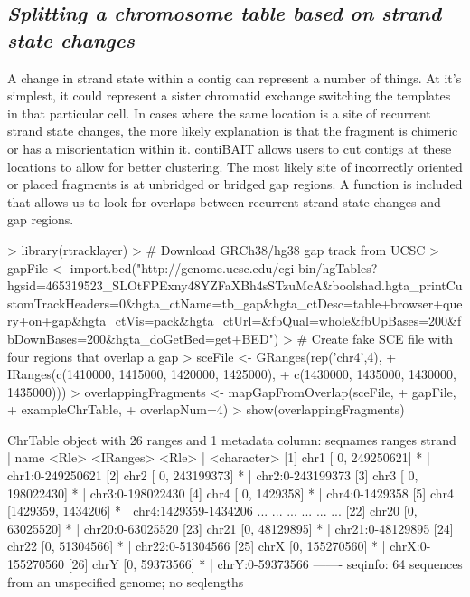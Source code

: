 \documentclass{article}
\begin{document}
\subsection{\textit{Splitting a chromosome table based on strand state changes}}
A change in strand state within a contig can represent a number of things. At it's simplest, it could represent a sister chromatid exchange switching the templates in that particular cell. In cases where the same location is a site of recurrent strand state changes, the more likely explanation is that the fragment is chimeric or has a misorientation within it. contiBAIT allows users to cut contigs at these locations to allow for better clustering. The most likely site of incorrectly oriented or placed fragments is at unbridged or bridged gap regions. A function is included that allows us to look for overlaps between recurrent strand state changes and gap regions.

\begin{Schunk}
\begin{Sinput}
> library(rtracklayer)
> # Download GRCh38/hg38 gap track from UCSC
> gapFile <- import.bed("http://genome.ucsc.edu/cgi-bin/hgTables?hgsid=465319523_SLOtFPExny48YZFaXBh4sSTzuMcA&boolshad.hgta_printCustomTrackHeaders=0&hgta_ctName=tb_gap&hgta_ctDesc=table+browser+query+on+gap&hgta_ctVis=pack&hgta_ctUrl=&fbQual=whole&fbUpBases=200&fbDownBases=200&hgta_doGetBed=get+BED")
> # Create fake SCE file with four regions that overlap a gap
> sceFile <- GRanges(rep('chr4',4), 
+ IRanges(c(1410000, 1415000, 1420000, 1425000), 
+ c(1430000, 1435000, 1430000, 1435000)))
> overlappingFragments <- mapGapFromOverlap(sceFile,
+  gapFile, 
+  exampleChrTable, 
+  overlapNum=4)
> show(overlappingFragments)
\end{Sinput}
\begin{Soutput}
ChrTable object with 26 ranges and 1 metadata column:
       seqnames               ranges strand   |                 name
          <Rle>            <IRanges>  <Rle>   |          <character>
   [1]     chr1 [      0, 249250621]      *   |     chr1:0-249250621
   [2]     chr2 [      0, 243199373]      *   |     chr2:0-243199373
   [3]     chr3 [      0, 198022430]      *   |     chr3:0-198022430
   [4]     chr4 [      0,   1429358]      *   |       chr4:0-1429358
   [5]     chr4 [1429359,   1434206]      *   | chr4:1429359-1434206
   ...      ...                  ...    ... ...                  ...
  [22]    chr20       [0,  63025520]      *   |     chr20:0-63025520
  [23]    chr21       [0,  48129895]      *   |     chr21:0-48129895
  [24]    chr22       [0,  51304566]      *   |     chr22:0-51304566
  [25]     chrX       [0, 155270560]      *   |     chrX:0-155270560
  [26]     chrY       [0,  59373566]      *   |      chrY:0-59373566
  -------
  seqinfo: 64 sequences from an unspecified genome; no seqlengths
\end{Soutput}
\end{Schunk}
\end{document}
